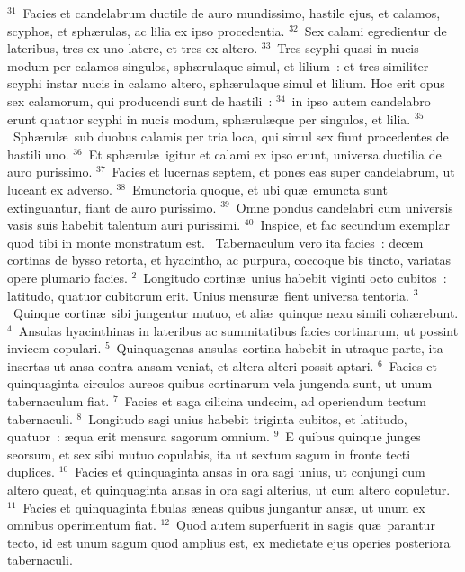 ${}^{31}$~Facies et candelabrum ductile de auro mundissimo, hastile ejus, et calamos, scyphos, et sph\ae rulas, ac lilia ex ipso procedentia.
${}^{32}$~Sex calami egredientur de lateribus, tres ex uno latere, et tres ex altero.
${}^{33}$~Tres scyphi quasi in nucis modum per calamos singulos, sph\ae rulaque simul, et lilium~: et tres similiter scyphi instar nucis in calamo altero, sph\ae rulaque simul et lilium. Hoc erit opus sex calamorum, qui producendi sunt de hastili~:
${}^{34}$~in ipso autem candelabro erunt quatuor scyphi in nucis modum, sph\ae rul\ae que per singulos, et lilia.
${}^{35}$~Sph\ae rul\ae\ sub duobus calamis per tria loca, qui simul sex fiunt procedentes de hastili uno.
${}^{36}$~Et sph\ae rul\ae\ igitur et calami ex ipso erunt, universa ductilia de auro purissimo.
${}^{37}$~Facies et lucernas septem, et pones eas super candelabrum, ut luceant ex adverso.
${}^{38}$~Emunctoria quoque, et ubi qu\ae\ emuncta sunt extinguantur, fiant de auro purissimo.
${}^{39}$~Omne pondus candelabri cum universis vasis suis habebit talentum auri purissimi.
${}^{40}$~Inspice, et fac secundum exemplar quod tibi in monte monstratum est.
~Tabernaculum vero ita facies~: decem cortinas de bysso retorta, et hyacintho, ac purpura, coccoque bis tincto, variatas opere plumario facies.
${}^{2}$~Longitudo cortin\ae\ unius habebit viginti octo cubitos~: latitudo, quatuor cubitorum erit. Unius mensur\ae\ fient universa tentoria.
${}^{3}$~Quinque cortin\ae\ sibi jungentur mutuo, et ali\ae\ quinque nexu simili coh\ae rebunt.
${}^{4}$~Ansulas hyacinthinas in lateribus ac summitatibus facies cortinarum, ut possint invicem copulari.
${}^{5}$~Quinquagenas ansulas cortina habebit in utraque parte, ita insertas ut ansa contra ansam veniat, et altera alteri possit aptari.
${}^{6}$~Facies et quinquaginta circulos aureos quibus cortinarum vela jungenda sunt, ut unum tabernaculum fiat.
${}^{7}$~Facies et saga cilicina undecim, ad operiendum tectum tabernaculi.
${}^{8}$~Longitudo sagi unius habebit triginta cubitos, et latitudo, quatuor~: \ae qua erit mensura sagorum omnium.
${}^{9}$~E quibus quinque junges seorsum, et sex sibi mutuo copulabis, ita ut sextum sagum in fronte tecti duplices.
${}^{10}$~Facies et quinquaginta ansas in ora sagi unius, ut conjungi cum altero queat, et quinquaginta ansas in ora sagi alterius, ut cum altero copuletur.
${}^{11}$~Facies et quinquaginta fibulas \ae neas quibus jungantur ans\ae , ut unum ex omnibus operimentum fiat.
${}^{12}$~Quod autem superfuerit in sagis qu\ae\ parantur tecto, id est unum sagum quod amplius est, ex medietate ejus operies posteriora tabernaculi.

